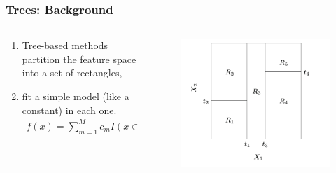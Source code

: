 \documentclass[
  shownotes,
  xcolor={svgnames},
  hyperref={colorlinks,citecolor=DarkBlue,linkcolor=DarkRed,urlcolor=DarkBlue}
  ]{beamer}
\begin{document}
\begin{frame}[fragile]
\frametitle{Trees: Background}


\begin{columns}[T] %
\begin{column}{.42\textwidth}
  
\begin{enumerate}
\item Tree-based methods partition the feature space into a set of rectangles,
\item  fit a simple model (like a constant) in each one. 
\begin{align}
f(x) = \sum_{m=1}^M c_m I(x\in R_m)
\end{align}
\end{enumerate}


\end{column}  
\hfill
\begin{column}{.48\textwidth}

 \begin{figure}[H] \centering
            \captionsetup{justification=centering}
              \includegraphics[scale=0.6]{figures/cart_final}                           
 \end{figure}

\end{column}
\end{columns}

\end{frame}
\end{document}
